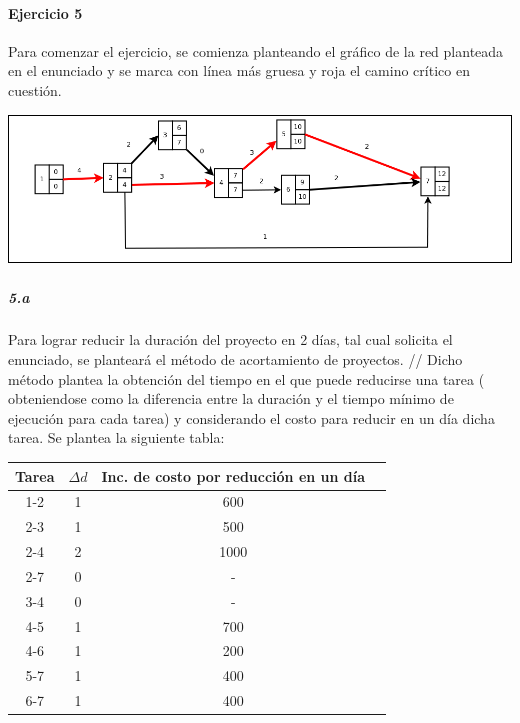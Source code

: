 \documentclass[a4paper,10pt]{article}
\begin{document}
  
  
\paragraph{Ejercicio 5}

Para comenzar el ejercicio, se comienza planteando el gr\'afico de la red planteada en el enunciado y se marca con l\'inea m\'as gruesa y roja el camino cr\'itico en cuesti\'on.

  \begin{center}
    \includegraphics[scale=0.4,keepaspectratio=true]{img/ej5-red.png} 
  \end{center}

\subparagraph {5.a}
Para lograr reducir la duraci\'on del proyecto en 2 d\'ias, tal cual solicita el enunciado, se plantear\'a el m\'etodo de acortamiento de proyectos. //
Dicho m\'etodo plantea la obtenci\'on del tiempo en el que puede reducirse una tarea ( obteniendose como la diferencia entre la duraci\'on y el tiempo m\'inimo de ejecuci\'on para cada tarea) y 
considerando el costo para reducir en un d\'ia dicha tarea. Se plantea la siguiente tabla:

   \begin{center}
   \begin{tabular}{|| c | c | c | c ||}
   \hline 
      Tarea & $\Delta d$ & Inc. de costo por reducci\'on en un d\'ia \\ \hline \hline
      1-2 & 1 & 600  \\ \hline
      2-3 & 1 & 500  \\ \hline 
      2-4 & 2 & 1000  \\ \hline
      2-7 & 0 & - \\ \hline
      3-4 & 0 & - \\ \hline
      4-5 & 1 & 700 \\ \hline
      4-6 & 1 & 200 \\ \hline
      5-7 & 1 & 400    \\ \hline
      6-7 & 1 & 400\\ \hline
   \end{tabular}
   \end{center}
\end{document}
